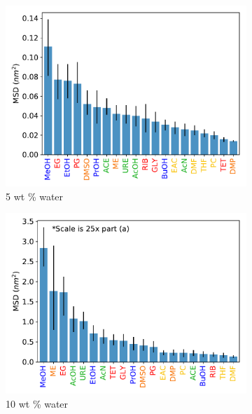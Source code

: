 \documentclass{article}
\begin{document}
  \begin{figure}
  \centering
  \begin{subfigure}{0.45\textwidth}
  \includegraphics[width=\textwidth]{all_5wt_tamsds.pdf}
  \caption{5 wt \% water}\label{fig:all_msds_5wt}
  \end{subfigure}
  \begin{subfigure}{0.45\textwidth}
  \includegraphics[width=\textwidth]{all_10wt_tamsds.pdf}
  \caption{10 wt \% water}\label{fig:all_msds_10wt}
  \end{subfigure}
  \begin{subfigure}{0.45\textwidth}

\end{subfigure}
\end{figure}
\end{document}
